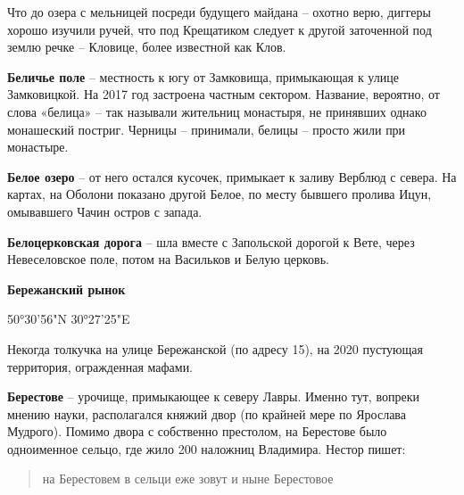 Что до озера с мельницей посреди будущего майдана – охотно верю, диггеры хорошо изучили ручей, что под Крещатиком следует к другой заточенной под землю речке – Кловице, более известной как Клов.\\

\medskip


\textbf{Беличье поле} – местность к югу от Замковища, примыкающая к улице Замковицкой. На 2017 год застроена частным сектором. Название, вероятно, от слова «белица» – так называли жительниц монастыря, не принявших однако монашеский постриг. Черницы – принимали, белицы – просто жили при монастыре.\\


\medskip






\textbf{Белое озеро} – от него остался кусочек, примыкает к заливу Верблюд с севера. На картах, на Оболони показано другой Белое, по месту бывшего пролива Ицун, омывавшего Чачин остров с запада.\\

\medskip


\textbf{Белоцерковская дорога} – шла вместе с Запольской дорогой к Вете, через Невеселовское поле, потом на Васильков и Белую церковь.\\

\medskip

\newpage

\textbf{Бережанский рынок}

50°30'56"N 30°27'25"E

Некогда толкучка на улице Бережанской (по адресу 15), на 2020 пустующая территория, огражденная мафами.\\

\medskip


\textbf{Берестове} – урочище, примыкающее к северу Лавры. Именно тут, вопреки мнению науки, располагался княжий двор (по крайней мере по Ярослава Мудрого). Помимо двора с собственно престолом, на Берестове было одноименное сельцо, где жило 200 наложниц Владимира. Нестор пишет:

\begin{quotation}
\noindent на Берестовем в сельци еже зовут и ныне Берестовое
\end{quotation}

